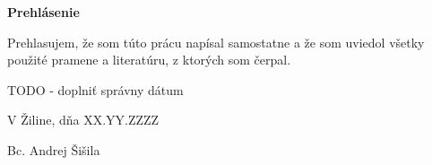 \centerline{\bf Prehlásenie}

\vspace{2em}

\noindent
Prehlasujem, že som túto prácu napísal samostatne a že som uviedol 
všetky použité pramene a literatúru, z ktorých som čerpal. 

\vspace{2em}

\noindent

\begin{huge}
    TODO - doplniť správny dátum
\end{huge}

V Žiline, dňa XX.YY.ZZZZ 

\hfill

Bc. Andrej Šišila